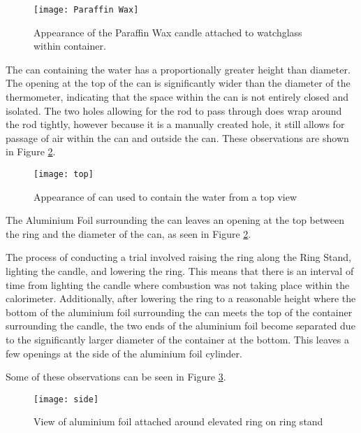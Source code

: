 \documentclass[
	letterpaper, %
	12pt, %
]{CSUniSchoolLabReport}
\begin{document}
\begin{figure}[H] %
  \centering %
  \texttt{[image: Paraffin Wax]} %
  \caption{Appearance of the Paraffin Wax candle attached to watchglass within container.}
  \label{fig:paraffin}
\end{figure}

\par The can containing the water has a proportionally greater height than diameter.
The opening at the top of the can is significantly wider than the diameter of the thermometer,
indicating that the space within the can is not entirely closed and isolated.
The two holes allowing for the rod to pass through does wrap around the rod
tightly, however because it is a manually created hole, it still allows for passage
of air within the can and outside the can. These observations are shown in
Figure \ref*{fig:cantop}.
\begin{figure}[H]
  \centering
  \texttt{[image: top]}
  \caption{Appearance of can used to contain the water from a top view}
  \label{fig:cantop}
\end{figure}

\par The Aluminium Foil surrounding the can leaves an opening at the top between
the ring and the diameter of the can, as seen in Figure \ref*{fig:cantop}.
\\
\par The process of conducting a trial involved raising the ring along the Ring Stand,
lighting the candle, and lowering the ring. This means that there is an interval of time
from lighting the candle where combustion was not taking place within the calorimeter.
Additionally, after lowering the ring to a reasonable height where the bottom of the
aluminium foil surrounding the can meets the top of the container surrounding the
candle, the two ends of the aluminium foil become separated due to the significantly
larger diameter of the container at the bottom. This leaves a few openings at the side
of the aluminium foil cylinder.
\\
\par Some of these observations can be seen in Figure \ref*{fig:canside}.
\begin{figure}[H]
  \centering
  \texttt{[image: side]}
  \caption{View of aluminium foil attached around elevated ring on ring stand}
  \label{fig:canside}
\end{figure}
\end{document}
